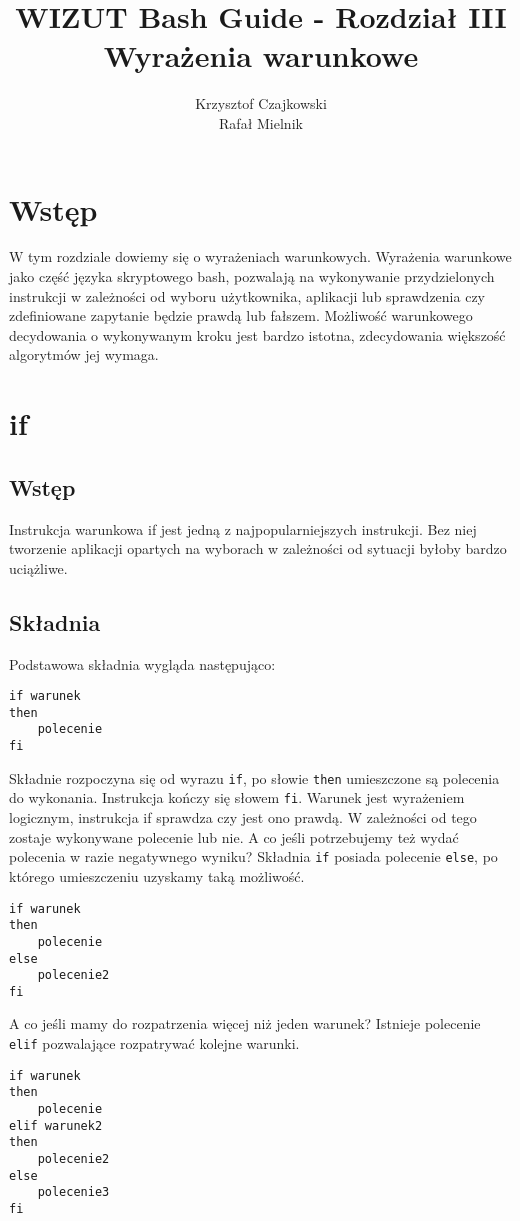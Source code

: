 \documentclass[10 pt, a4paper]{article}
\author{Krzysztof Czajkowski\\
Rafał Mielnik}
\title{WIZUT Bash Guide - Rozdział III\\
Wyrażenia warunkowe}
\begin{document}
\maketitle
\tableofcontents
\newpage

\section{Wstęp}
W tym rozdziale dowiemy się o wyrażeniach warunkowych. Wyrażenia warunkowe jako część języka skryptowego bash, pozwalają na wykonywanie przydzielonych instrukcji w zależności od wyboru użytkownika, aplikacji lub sprawdzenia czy zdefiniowane zapytanie będzie prawdą lub fałszem. Możliwość warunkowego decydowania o wykonywanym kroku jest bardzo istotna, zdecydowania większość algorytmów jej wymaga.
\section{if}
\subsection{Wstęp}
Instrukcja warunkowa if jest jedną z najpopularniejszych instrukcji. Bez niej tworzenie aplikacji opartych na wyborach w zależności od sytuacji byłoby bardzo uciążliwe.
\subsection{Składnia}
Podstawowa składnia wygląda następująco:
\begin{lstlisting}
if warunek
then
	polecenie
fi
\end{lstlisting}
Składnie rozpoczyna się od wyrazu \texttt{if}, po słowie \texttt{then} umieszczone są polecenia do wykonania. Instrukcja kończy się słowem \texttt{fi}. Warunek jest wyrażeniem logicznym, instrukcja if sprawdza czy jest ono prawdą. W zależności od tego zostaje wykonywane polecenie lub nie.\newline
A co jeśli potrzebujemy też wydać polecenia w razie negatywnego wyniku? Składnia \texttt{if} posiada polecenie \texttt{else}, po którego umieszczeniu uzyskamy taką możliwość.
\begin{lstlisting}
if warunek
then
	polecenie
else
	polecenie2
fi
\end{lstlisting}
A co jeśli mamy do rozpatrzenia więcej niż jeden warunek? Istnieje polecenie \texttt{elif} pozwalające rozpatrywać kolejne warunki.
\begin{lstlisting}
if warunek
then
	polecenie
elif warunek2
then
	polecenie2
else
	polecenie3
fi
\end{lstlisting}
\end{document}

